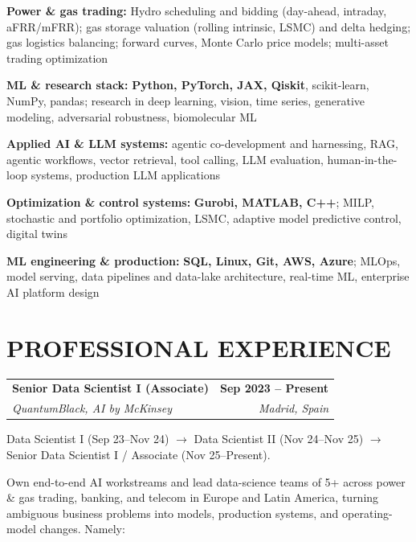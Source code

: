 \documentclass[10pt,a4paper]{article}
\makeatletter
\newcommand{\role}[4]{%
  \begin{tabularx}{\textwidth}{@{}Xr@{}}
    \textbf{#1} & \textbf{#2} \\
    \textit{#3} & \textit{#4} \\
  \end{tabularx}
  \vspace{0.05em}
}
\newcommand{\skillline}[2]{%
  \textbf{#1:} #2\par\vspace{0.10em}
}
\makeatother
\begin{document}
\small

\skillline{Power \& gas trading}{
Hydro scheduling and bidding (day-ahead, intraday, aFRR/mFRR); gas storage valuation
(rolling intrinsic, LSMC) and delta hedging; gas logistics balancing; forward curves,
Monte Carlo price models; multi-asset trading optimization}

\skillline{ML \& research stack}{
\textbf{Python, PyTorch, JAX, Qiskit}, scikit-learn, NumPy, pandas; research in deep learning, vision, time series, generative modeling, adversarial robustness, biomolecular ML}

\skillline{Applied AI \& LLM systems}{agentic co-development and harnessing, RAG, agentic workflows,
vector retrieval, tool calling, LLM evaluation, human-in-the-loop systems, production LLM applications}

\skillline{Optimization \& control systems}{
\textbf{Gurobi, MATLAB, C++}; MILP, stochastic and portfolio optimization, LSMC, adaptive model predictive control, digital twins}

\skillline{ML engineering \& production}{
\textbf{SQL, Linux, Git, AWS, Azure}; MLOps, model serving, data pipelines and data-lake architecture, real-time ML, enterprise AI platform design}

\section{PROFESSIONAL EXPERIENCE}

\small

\role
{Senior Data Scientist I (Associate)}
{Sep 2023 -- Present}
{QuantumBlack, AI by McKinsey}
{Madrid, Spain}
{Data Scientist I (Sep 23--Nov 24)
$\rightarrow$
Data Scientist II (Nov 24--Nov 25)
$\rightarrow$
Senior Data Scientist I / Associate (Nov 25--Present).}

Own end-to-end AI workstreams and lead data-science teams of 5+ across power \& gas trading,
  banking, and telecom in Europe and Latin America, turning ambiguous business problems into
  models, production systems, and operating-model changes. Namely:
\end{document}
